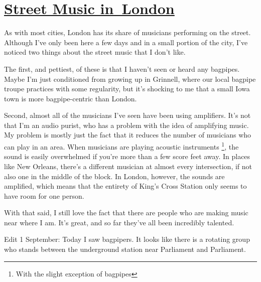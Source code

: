 \hypertarget{street-music-in-london}{%
\section{\href{street-music-in-london.html}{Street Music in~London}}\label{street-music-inlondon}}

As with most cities, London has its share of musicians performing on the
street. Although I've only been here a few days and in a small portion
of the city, I've noticed two things about the street music that I don't
like.

The first, and pettiest, of these is that I haven't seen or heard any
bagpipes. Maybe I'm just conditioned from growing up in Grinnell, where
our local bagpipe troupe practices with some regularity, but it's
shocking to me that a small Iowa town is more bagpipe-centric than
London.

Second, almost all of the musicians I've seen have been using
amplifiers. It's not that I'm an audio purist, who has a problem with
the idea of amplifying music. My problem is mostly just the fact that it
reduces the number of musicians who can play in an area. When musicians
are playing acoustic instruments \footnote{With the slight exception of
  bagpipes}, the sound is easily overwhelmed if you're more than a few
score feet away. In places like New Orleans, there's a different
musician at almost every intersection, if not also one in the middle of
the block. In London, however, the sounds are amplified, which means
that the entirety of King's Cross Station only seems to have room for
one person.

With that said, I still love the fact that there are people who are
making music near where I am. It's great, and so far they've all been
incredibly talented.

Edit 1 September: Today I saw bagpipers. It looks like there is a
rotating group who stands between the underground station near
Parliament and Parliament.
